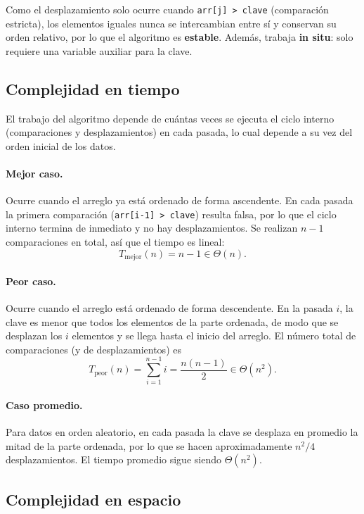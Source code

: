 Como el desplazamiento solo ocurre cuando \texttt{arr[j] > clave} (comparación estricta), los elementos iguales nunca se intercambian entre sí y conservan su orden relativo, por lo que el algoritmo es \textbf{estable}. Además, trabaja \textbf{in situ}: solo requiere una variable auxiliar para la clave.

\subsection{Complejidad en tiempo}

El trabajo del algoritmo depende de cuántas veces se ejecuta el ciclo interno (comparaciones y desplazamientos) en cada pasada, lo cual depende a su vez del orden inicial de los datos.

\paragraph{Mejor caso.} Ocurre cuando el arreglo ya está ordenado de forma ascendente. En cada pasada la primera comparación (\texttt{arr[i-1] > clave}) resulta falsa, por lo que el ciclo interno termina de inmediato y no hay desplazamientos. Se realizan $n-1$ comparaciones en total, así que el tiempo es lineal:
\[
  T_{\text{mejor}}(n) = n - 1 \in \Theta(n).
\]

\paragraph{Peor caso.} Ocurre cuando el arreglo está ordenado de forma descendente. En la pasada $i$, la clave es menor que todos los elementos de la parte ordenada, de modo que se desplazan los $i$ elementos y se llega hasta el inicio del arreglo. El número total de comparaciones (y de desplazamientos) es
\[
  T_{\text{peor}}(n) = \sum_{i=1}^{n-1} i = \frac{n(n-1)}{2} \in \Theta(n^2).
\]

\paragraph{Caso promedio.} Para datos en orden aleatorio, en cada pasada la clave se desplaza en promedio la mitad de la parte ordenada, por lo que se hacen aproximadamente $n^2/4$ desplazamientos. El tiempo promedio sigue siendo $\Theta(n^2)$.

\subsection{Complejidad en espacio}

